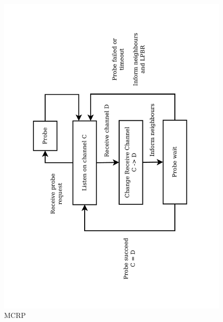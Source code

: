 \begin{figure}
\centering
\includegraphics[trim=2cm 2cm 2cm 2cm, clip=true, totalheight=0.36\textheight, angle=270]{figures/channelSwitching.pdf}
\caption{MCRP}
\label{fig_mcrpDiagram}
\end{figure}

